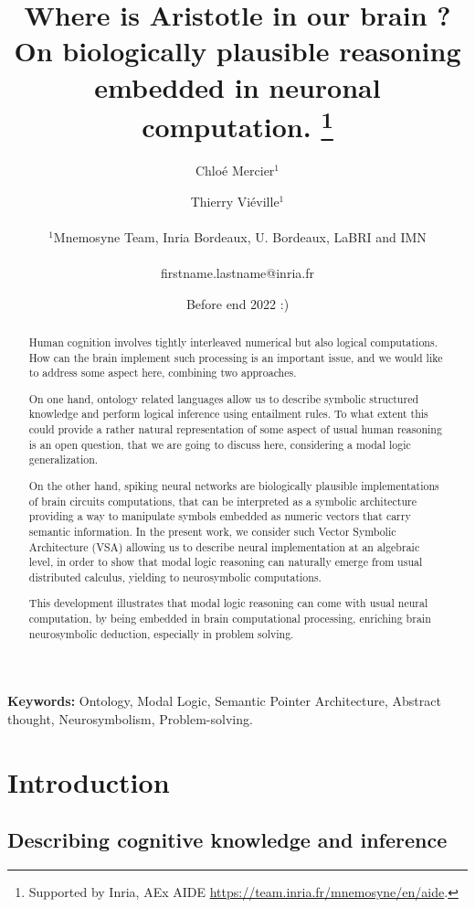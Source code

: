 \documentclass[a4]{article}
\title{Where is Aristotle in our brain ? On biologically plausible reasoning embedded in neuronal computation.
\thanks{Supported by Inria, AEx AIDE \url{https://team.inria.fr/mnemosyne/en/aide}.}}
\author{Chloé Mercier$^1$\and
Thierry Viéville$^1$\\
\\%
$^1$Mnemosyne Team, Inria Bordeaux, U. Bordeaux, LaBRI and IMN \\
\\%
firstname.lastname@inria.fr
}
\date{Before end 2022 :)}
\begin{document}
\iftrue

\maketitle

\begin{abstract}

Human cognition involves tightly interleaved numerical but also logical computations. How can the brain implement such processing is an important issue, and we would like to address some aspect here, combining two approaches.

On one hand, ontology related languages allow us to describe symbolic structured knowledge and perform logical inference using entailment rules. To what extent this could provide a rather natural representation of some aspect of usual human reasoning is an open question, that we are going to discuss here, considering a modal logic generalization.

On the other hand, spiking neural networks are biologically plausible implementations of brain circuits computations, that can be interpreted as a symbolic architecture providing a way to manipulate symbols embedded as numeric vectors that carry semantic information. In the present work, we consider such Vector Symbolic Architecture (VSA) allowing us to describe neural implementation at an algebraic level, in order to show that modal logic reasoning can naturally emerge from usual distributed calculus, yielding to neurosymbolic computations.

This development illustrates that modal logic reasoning can come with usual neural computation, by being embedded in brain computational processing, enriching brain neurosymbolic deduction, especially in problem solving.

\end{abstract}

{{\bf Keywords:} Ontology, Modal Logic, Semantic Pointer Architecture, Abstract thought, Neurosymbolism, Problem-solving.}

\section{Introduction}

\subsection{Describing cognitive knowledge and inference}
\end{document}
